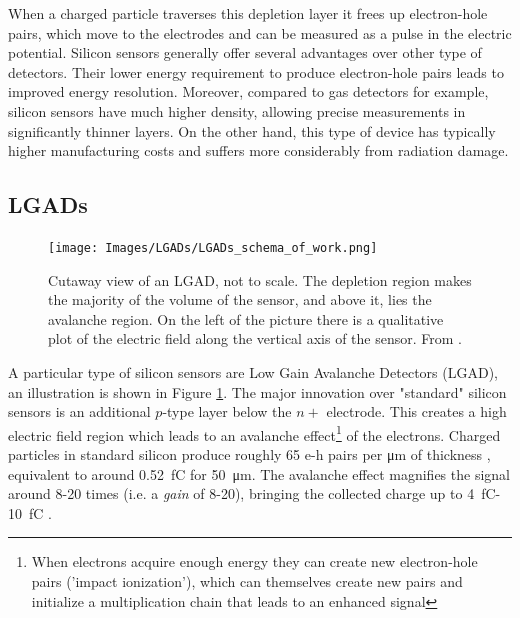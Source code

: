 When a charged particle traverses this depletion layer it frees up electron-hole pairs, which move to the electrodes and can be measured as a pulse in the electric potential.
Silicon sensors generally offer several advantages over other type of detectors. Their lower energy requirement to produce electron-hole pairs leads to improved energy resolution. Moreover, compared to gas detectors for example, silicon sensors have much higher density, allowing precise measurements in significantly thinner layers. On the other hand, this type of device has typically higher manufacturing costs and suffers more considerably from radiation damage. 

\subsection{LGADs}

\begin{figure}[!ht]
    \begin{minipage}[c]{.45\linewidth}
        \texttt{[image: Images/LGADs/LGADs\_schema\_of\_work.png]}
    \end{minipage}
    \hfill
    \begin{minipage}[c]{.4\linewidth}
        \caption{Cutaway view of an LGAD, not to scale. The depletion region makes the majority of the volume of the sensor, and above it, lies the avalanche region. On the left of the picture there is a qualitative plot of the electric field along the vertical axis of the sensor. From \cite{cernTechnicalDesign}.}
        \label{fig:LGADs_schema}
    \end{minipage}
\end{figure} 

A particular type of silicon sensors are Low Gain Avalanche Detectors (LGAD), an illustration is shown in Figure \ref{fig:LGADs_schema}. The major innovation over "standard" silicon sensors is an additional $p$-type layer below the $n+$ electrode. This creates a high electric field region which leads to an avalanche effect\footnote[2]{When electrons acquire enough energy they can create new electron-hole pairs ('impact ionization'), which can themselves create new pairs and initialize a multiplication chain that leads to an enhanced signal} of the electrons. 
Charged particles in standard silicon produce roughly 65 e-h pairs per \unit{\micro\meter} of thickness \cite{meroli_energy_loss2011}, equivalent to around \qty{0.52}{\femto\coulomb} for \qty{50}{\micro\meter}. The avalanche effect magnifies the signal around 8-20 times (i.e. a \textit{gain} of 8-20), bringing the collected charge up to \qty{4}{\femto\coulomb}-\qty{10}{\femto\coulomb} \cite{cernTechnicalDesign}. %

